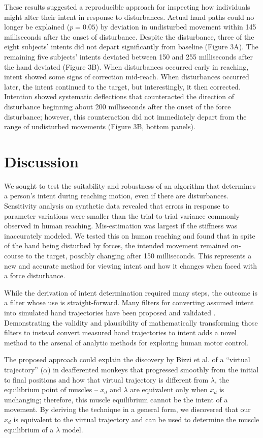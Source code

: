 These results suggested a reproducible approach for inspecting how individuals might alter their intent in response to disturbances. Actual hand paths could no longer be explained ($p=0.05$) by deviation in undisturbed movement within 145 milliseconds after the onset of disturbance. Despite the disturbance, three of the eight subjects' intents did not depart significantly from baseline (Figure 3A). The remaining five subjects' intents deviated between 150 and 255 milliseconds after the hand deviated (Figure 3B). When disturbances occurred early in reaching, intent showed some signs of correction mid-reach. When disturbances occurred later, the intent continued to the target, but interestingly, it then corrected. Intention showed systematic deflections that counteracted the direction of disturbance beginning about 200 milliseconds after the onset of the force disturbance; however, this counteraction did not immediately depart from the range of undisturbed movements (Figure 3B, bottom panels).

\section*{Discussion}
We sought to test the suitability and robustness of an algorithm that determines a person's intent during reaching motion, even if there are disturbances. Sensitivity analysis on synthetic data revealed that errors in response to parameter variations were smaller than the trial-to-trial variance commonly observed in human reaching. Mis-estimation was largest if the stiffness was inaccurately modeled. We tested this on human reaching and found that in spite of the hand being disturbed by forces, the intended movement remained on-course to the target, possibly changing after 150 milliseconds. This represents a new and accurate method for viewing intent and how it changes when faced with a force disturbance.

While the derivation of intent determination required many steps, the outcome is a filter whose use is straight-forward. Many filters for converting assumed intent into simulated hand trajectories have been proposed and validated \cite{shadmehr1994adaptive, franklin2003adaptation, burdet2006stability}. Demonstrating the validity and plausibility of mathematically transforming those filters to instead convert measured hand trajectories to intent adds a novel method to the arsenal of analytic methods for exploring human motor control.

The proposed approach could explain the discovery by Bizzi et al. \cite{bizzi1984posture} of a ``virtual trajectory'' ($\alpha$) in deafferented monkeys that progressed smoothly from the initial to final positions and how that virtual trajectory is different from $\lambda$, the equilibrium point of muscles -- $x_d$ and $\lambda$ are equivalent only when $x_d$ is unchanging; therefore, this muscle equilibrium cannot be the intent of a movement. By deriving the technique in a general form, we discovered that our $x_d$ is equivalent to the virtual trajectory and can be used to determine the muscle equilibrium of a $\lambda$ model.

